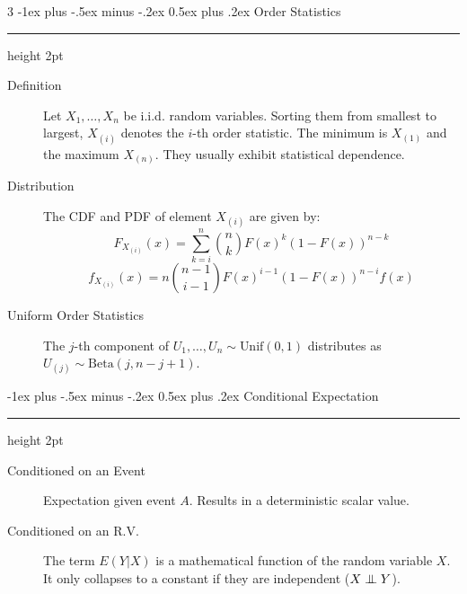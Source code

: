 \documentclass[10pt,landscape]{article}
\makeatletter
\newcommand\independent{\protect\mathpalette{\protect\independenT}{\perp}}
\def\independenT#1#2{\mathrel{\setbox0\hbox{$#1#2$}%
    \copy0\kern-\wd0\mkern4mu\box0}}
\newcommand{\Beta}{\textrm{Beta}}
\newcommand{\Unif}{\textrm{Unif}}
\renewcommand{\section}{\@startsection{section}{1}{0mm}%
                                {-1ex plus -.5ex minus -.2ex}%
                                {0.5ex plus .2ex}%
                                {\normalfont\large\bfseries}}
\makeatother
\begin{document}
\begin{multicols*}{3}
\section{Order Statistics}\smallskip \hrule height 2pt \smallskip
\begin{description}
    \item[Definition] Let $X_1, \dots, X_n$ be i.i.d. random variables. Sorting them from smallest to largest, $X_{(i)}$ denotes the $i$-th order statistic. The minimum is $X_{(1)}$ and the maximum $X_{(n)}$. They usually exhibit statistical dependence.
    \item[Distribution] The CDF and PDF of element $X_{(i)}$ are given by:
        \[F_{X_{(i)}}(x) = \sum_{k=i}^n \binom{n}{k} F(x)^k(1 - F(x))^{n - k}\]
    \[f_{X_{(i)}}(x) = n\binom{n - 1}{i - 1}F(x)^{i-1}(1 - F(x))^{n-i}f(x)\]
    \item[Uniform Order Statistics] The $j$-th component of $U_1,\dots,U_n \sim \Unif(0,1)$ distributes as $U_{(j)} \sim \Beta(j, n - j + 1)$.
\end{description}


\section{Conditional Expectation}\smallskip \hrule height 2pt \smallskip
\begin{description}
    \item[Conditioned on an Event] Expectation given event $A$. Results in a deterministic scalar value.
\end{description}
        \medskip
\begin{description}
    \item[Conditioned on an R.V.] The term $E(Y|X)$ is a mathematical function of the random variable $X$. It only collapses to a constant if they are independent ($X \independent Y$).
        

\end{description}
\end{multicols*}
\end{document}
